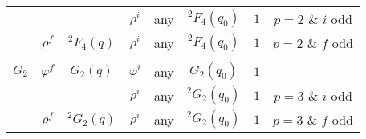 \documentclass[11pt]{article}
\numberwithin{equation}{section}
\theoremstyle{shdefinition}
\theoremstyle{shplain}
\newcommand{\p}{\varphi}
\newcommand{\<}{\langle}
\renewcommand{\>}{\rangle}
\renewcommand{\:}{\colon}
\begin{document}
\begin{table}
\begin{tabular}{cccccccc}
             &          &                  & $\rho^i$ & any        & ${}^2F_4(q_0)$    & $1$       & $p=2$ \& $i$ odd         \\[5.5pt]
             & $\rho^f$ & ${}^2F_4(q)$     & $\rho^i$ & any        & ${}^2F_4(q_0)$    & $1$       & $p=2$ \& $f$ odd         \\[5.5pt]
\hline\\[-9pt]
$G_2$        & $\p^f$   & $G_2(q)$         & $\p^i$   & any        & $G_2(q_0)$        & $1$       &                          \\
             &          &                  & $\rho^i$ & any        & ${}^2G_2(q_0)$    & $1$       & $p=3$ \& $i$ odd         \\[5.5pt]
             & $\rho^f$ & ${}^2G_2(q)$     & $\rho^i$ & any        & ${}^2G_2(q_0)$    & $1$       & $p=3$ \& $f$ odd         \\[5.5pt]
\hline
\end{tabular}
\end{table}
\end{document}
